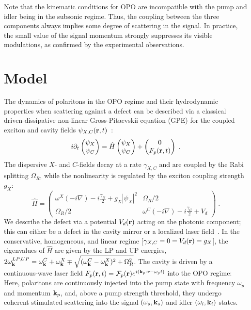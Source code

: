 Note that the kinematic conditions for OPO are incompatible with the
pump and idler being in the subsonic regime. Thus, the coupling
between the three components always implies some degree of scattering
in the signal. In practice, the small value of the signal momentum
strongly suppresses its visible modulations, as confirmed by the
experimental observations.

\section{Model}
\label{sec:model-opo}

The dynamics of polaritons in the OPO regime and their hydrodynamic
properties when scattering against a defect can be described via a
classical driven-dissipative non-linear Gross-Pitaevskii equation
(GPE) for the coupled exciton and cavity fields $\psi_{X,C}
(\mathbf{r},t)$~\cite{Whittaker_2005,Carusotto_2013}:
%
\begin{equation}
  i\partial_t \begin{pmatrix} \psi_X \\ \psi_C \end{pmatrix} =
  \hat{H} \begin{pmatrix} \psi_X \\ \psi_C \end{pmatrix}
  + \begin{pmatrix} 0 \\ F_p(\mathbf{r},t) \end{pmatrix} \; .
\label{eq:gpequ}
\end{equation}
%
The dispersive $X$- and $C$-fields decay at a rate $\gamma_{X,C}$ and
are coupled by the Rabi splitting $\Omega_R$, while the nonlinearity
is regulated by the exciton coupling strength $g_X$:
%
\begin{equation}
  \hat{H} = \begin{pmatrix} \omega^{X}(-i\nabla) - i
    \frac{\gamma_X}{2} + g_X |\psi_X|^2 & \Omega_R/2 \\ \Omega_R/2 &
    \omega^C(-i\nabla) - i \frac{\gamma_C}{2} + V_d \end{pmatrix} \;
  .
\end{equation}
%
We describe the defect via a potential $V_d (\mathbf{r})$ acting on the
photonic component; this can either be a defect in the cavity mirror
or a localized laser field~\cite{Amo_2009,Amo_2010,Zajac_2012}.
%
In the conservative, homogeneous, and linear regime [$\gamma_{X,C}=0=
V_d (\mathbf{r})= g_X$], the eigenvalues of $\hat{H}$ are given by the
LP and UP energies, $2
\omega_{\mathbf{k}}^{LP,UP} = \omega_{\mathbf{k}}^{C} +
\omega_{\mathbf{k}}^{X} \mp \sqrt{(\omega_{\mathbf{k}}^{C} -
  \omega_{\mathbf{k}}^{X})^2 + \Omega_R^2}$.
%
The cavity is driven by a continuous-wave laser field $F_p(\mathbf{r},t)
= \mathcal{F}_p(\mathbf{r}) e^{i (\mathbf{k}_p \cdot \mathbf{r} - \omega_p
  t)}$ into the OPO regime: Here, polaritons are continuously injected
into the pump state with frequency $\omega_p$ and momentum
$\mathbf{k}_p$, and, above a pump strength threshold, they undergo coherent
stimulated scattering into the signal $(\omega_s, \mathbf{k}_s)$ and
idler $(\omega_i, \mathbf{k}_i)$ states. 

